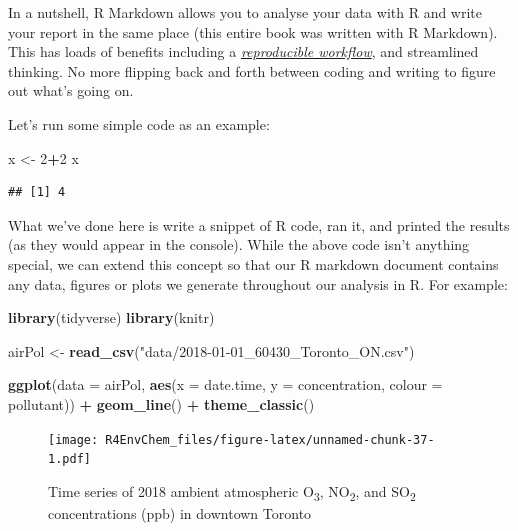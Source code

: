 \documentclass[
]{book}
\newenvironment{Shaded}{\begin{snugshade}}{\end{snugshade}}
\newcommand{\AttributeTok}[1]{\textcolor[rgb]{0.13,0.29,0.53}{#1}}
\newcommand{\DecValTok}[1]{\textcolor[rgb]{0.00,0.00,0.81}{#1}}
\newcommand{\FunctionTok}[1]{\textcolor[rgb]{0.13,0.29,0.53}{\textbf{#1}}}
\newcommand{\NormalTok}[1]{#1}
\newcommand{\OtherTok}[1]{\textcolor[rgb]{0.56,0.35,0.01}{#1}}
\newcommand{\SpecialCharTok}[1]{\textcolor[rgb]{0.81,0.36,0.00}{\textbf{#1}}}
\newcommand{\StringTok}[1]{\textcolor[rgb]{0.31,0.60,0.02}{#1}}
\begin{document}
In a nutshell, R Markdown allows you to analyse your data with R and write your report in the same place (this entire book was written with R Markdown). This has loads of benefits including a \href{https://www.youtube.com/watch?v=s3JldKoA0zw}{\emph{reproducible workflow}}, and streamlined thinking. No more flipping back and forth between coding and writing to figure out what's going on.

Let's run some simple code as an example:

\begin{Shaded}
\begin{Highlighting}[]
\NormalTok{x }\OtherTok{\textless{}{-}} \DecValTok{2}\SpecialCharTok{+}\DecValTok{2}
\NormalTok{x}
\end{Highlighting}
\end{Shaded}

\begin{verbatim}
## [1] 4
\end{verbatim}

What we've done here is write a snippet of R code, ran it, and printed the results (as they would appear in the console). While the above code isn't anything special, we can extend this concept so that our R markdown document contains any data, figures or plots we generate throughout our analysis in R. For example:

\begin{Shaded}
\begin{Highlighting}[]
\FunctionTok{library}\NormalTok{(tidyverse) }
\FunctionTok{library}\NormalTok{(knitr)}

\NormalTok{airPol }\OtherTok{\textless{}{-}} \FunctionTok{read\_csv}\NormalTok{(}\StringTok{"data/2018{-}01{-}01\_60430\_Toronto\_ON.csv"}\NormalTok{)}

\FunctionTok{ggplot}\NormalTok{(}\AttributeTok{data =}\NormalTok{ airPol, }
       \FunctionTok{aes}\NormalTok{(}\AttributeTok{x =}\NormalTok{ date.time, }
           \AttributeTok{y =}\NormalTok{ concentration, }
           \AttributeTok{colour =}\NormalTok{ pollutant)) }\SpecialCharTok{+} 
  \FunctionTok{geom\_line}\NormalTok{() }\SpecialCharTok{+}
  \FunctionTok{theme\_classic}\NormalTok{()}
\end{Highlighting}
\end{Shaded}

\begin{figure}
\centering
\texttt{[image: R4EnvChem\_files/figure-latex/unnamed-chunk-37-1.pdf]}
\caption{\label{fig:unnamed-chunk-37}Time series of 2018 ambient atmospheric O\textsubscript{3}, NO\textsubscript{2}, and SO\textsubscript{2} concentrations (ppb) in downtown Toronto}
\end{figure}
\end{document}
